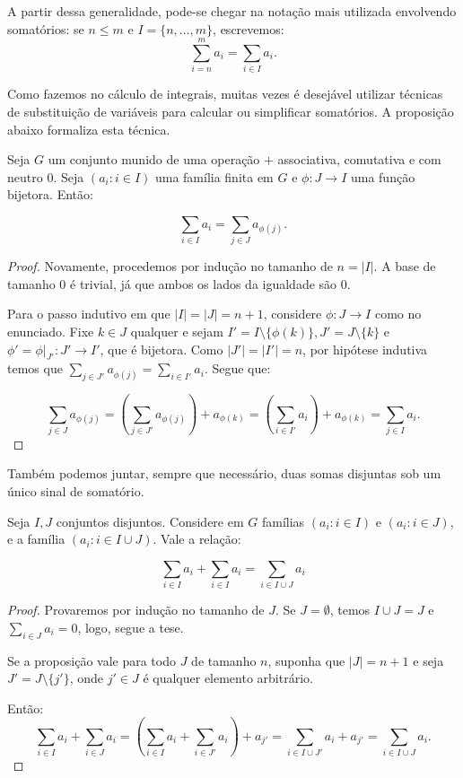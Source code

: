 A partir dessa generalidade, pode-se chegar na notação mais utilizada envolvendo somatórios: se $n\leq m$ e $I=\{n, \dots, m\}$, escrevemos:
\[\sum_{i=n}^m a_i=\sum_{i\in I} a_i.\]


Como fazemos no cálculo de integrais, muitas vezes é desejável utilizar técnicas de substituição de variáveis para calcular ou simplificar somatórios.
A proposição abaixo formaliza esta técnica.
\begin{prop}\label{prop:group_sumVarChange}
    Seja $G$ um conjunto munido de uma operação $+$ associativa, comutativa e com neutro $0$.
Seja $(a_i: i \in I)$ uma família finita em $G$ e $\phi:J\rightarrow I$ uma função bijetora.
Então:

    \[\sum_{i \in I}a_i=\sum_{j \in J}a_{\phi(j)}.\]

\end{prop}
\begin{proof}
Novamente, procedemos por indução no tamanho de $n=|I|$.
A base de tamanho $0$ é trivial, já que ambos os lados da igualdade são $0$.

Para o passo indutivo em que $|I|=|J|=n+1$, considere $\phi:J\rightarrow I$ como no enunciado.
Fixe $k \in J$ qualquer e sejam $I'=I\setminus\{\phi(k)\}, J'=J\setminus\{k\}$ e $\phi'=\phi|_{J'}:J'\rightarrow I'$, que é bijetora.
Como $|J'|=|I'|=n$, por hipótese indutiva temos que $\sum_{j \in J'}a_{\phi(j)}=\sum_{i \in I'}a_i$.
Segue que:

\[\sum_{j \in J}a_{\phi(j)}=\left(\sum_{j \in J'}a_{\phi(j)}\right)+a_{\phi(k)}=\left(\sum_{i \in I'}a_{i}\right)+a_{\phi(k)}=\sum_{j \in I}a_{i}.\]
\end{proof}

Também podemos juntar, sempre que necessário, duas somas disjuntas sob um único sinal de somatório.
\begin{prop}\label{prop:group_sumConcat}
    Seja $I, J$ conjuntos disjuntos. Considere em $G$ famílias $(a_i: i \in I)$ e $(a_i: i \in J)$, e a família $(a_i: i \in I\cup J)$.
    Vale a relação:

    \[\sum_{i \in I}a_i+\sum_{i \in I}a_i=\sum_{i \in I\cup J}a_i\]
\end{prop}
\begin{proof}
    Provaremos por indução no tamanho de $J$.
    Se $J=\emptyset$, temos $I\cup J=J$ e $\sum_{i \in J}a_i=0$, logo, segue a tese.

    Se a proposição vale para todo $J$ de tamanho $n$, suponha que $|J|=n+1$ e seja $J'=J\setminus \{j'\}$, onde $j' \in J$ é qualquer elemento arbitrário.

    Então:
    \[\sum_{i \in I}a_i+\sum_{i \in J}a_i=\left(\sum_{i \in I}a_i+\sum_{i \in J'}a_i\right)+a_{j'}=\sum_{i \in I\cup J'}a_i+a_{j'}=\sum_{i \in I\cup J}a_i.\]
\end{proof}

